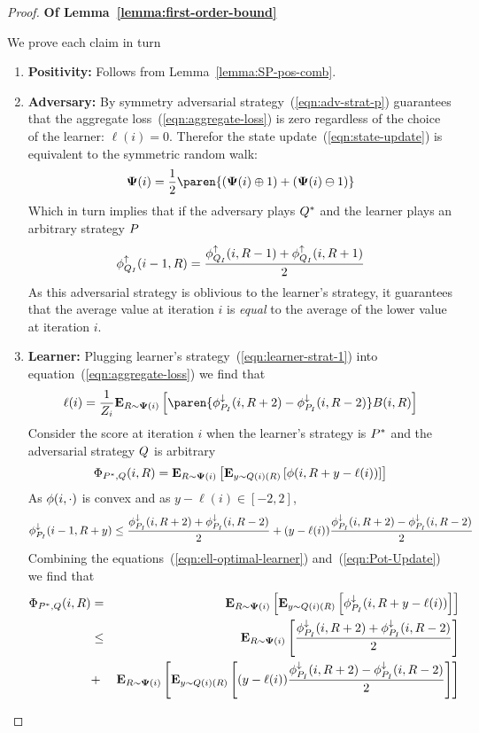 \documentclass[anon,12pt]{colt2024} %
\begin{document}
\begin{proof} {\bf Of Lemma~\ref{lemma:first-order-bound}}

    We prove each claim in turn
\begin{enumerate}
\item {\bf Positivity:} Follows from Lemma~\ref{lemma:SP-pos-comb}.
\item{\bf Adversary:} By symmetry adversarial strategy~(\ref{eqn:adv-strat-p}) guarantees that
  the aggregate loss~(\ref{eqn:aggregate-loss}) is zero regardless of
  the choice of the learner: $\ell(i)=0$.
  Therefor the state update~(\ref{eqn:state-update}) is equivalent to
  the symmetric random walk:
  $$\state(i) = \frac{1}{2} \paren{(\state(i) \oplus 1) + (\state(i)
    \ominus 1)}$$
  Which in turn implies that if the adversary plays $Q^*$
  and the learner plays an arbitrary strategy $P$
  \begin{equation} \label{eqn:lower}
    \phi_{Q_I}^{\uparrow}(i-1,R) = \frac{\phi_{Q_I}^{\uparrow}(i,R-1)+\phi_{Q_I}^{\uparrow}(i,R+1)}{2}
  \end{equation}
  As this adversarial strategy is oblivious to the learner's strategy, it
  guarantees that the average value at iteration $i$ is {\em equal} to the
  average of the lower value at iteration $i$.
\item {\bf Learner:}
  Plugging learner's strategy~(\ref{eqn:learner-strat-1})
  into equation~(\ref{eqn:aggregate-loss}) we find that
 \begin{equation} \label{eqn:ell-optimal-learner}
   \ell(i) = \frac{1}{Z_{i}} \E{\R \sim \state(i)}{\paren{\upperpotb(i,\R+2)-\upperpotb(i,\R-2)}
   \Bias(i,\R)}
\end{equation}
  Consider the score at iteration $i$ when the learner's strategy
  is $P^*$ and the adversarial strategy  $Q$ is arbitrary
     \begin{equation} \label{eqn:Pot-Update}
    \Phi_{P^*,Q}(i,R) = {\bf E}_{R \sim {\bf \Psi}(i)}\left[  {\bf E}_{y \sim
      Q(i)(R)}\left[ \phi(i,R+y-\ell(i)) \right] \right]
  \end{equation}
  As $\phi(i,\cdot)$ is convex and as $y-\ell(i) \in [-2,2]$,
  \begin{equation} \label{eqn:pot-upper}
    \phi_{P_I}^{\downarrow}(i-1,R+y) \leq \frac{\phi_{P_I}^{\downarrow}(i,R+2)+\phi_{P_I}^{\downarrow}(i,R-2)}{2} +
    (y-\ell(i)) \frac{\phi_{P_I}^{\downarrow}(i,R+2)-\phi_{P_I}^{\downarrow}(i,R-2)}{2}
    \end{equation}
  Combining the equations~(\ref{eqn:ell-optimal-learner}) and~(\ref{eqn:Pot-Update}) we find that
  \begin{eqnarray}
  \Phi_{P^*,Q}(i,R)&=&{\bf E}_{R \sim {\bf \Psi}(i)}\left[ {\bf E}_{y \sim Q(i)(R)}\left[ \phi_{P_I}^{\downarrow}(i,R+y-\ell(i)) \right] \right]\\
  &\leq & {\bf E}_{R \sim {\bf \Psi}(i)}\left[ \frac{\phi_{P_I}^{\downarrow}(i,R+2)+\phi_{P_I}^{\downarrow}(i,R-2)}{2} \right]\\
  &+&
  {\bf E}_{R \sim {\bf \Psi}(i)}\left[ {\bf E}_{y \sim Q(i)(R)}\left[ (y-\ell(i)) \frac{\phi_{P_I}^{\downarrow}(i,R+2)-\phi_{P_I}^{\downarrow}(i,R-2)}{2} \right] \right] \label{eqn:zero-term}
  \end{eqnarray}
  

\end{enumerate}
\end{proof}
\end{document}
